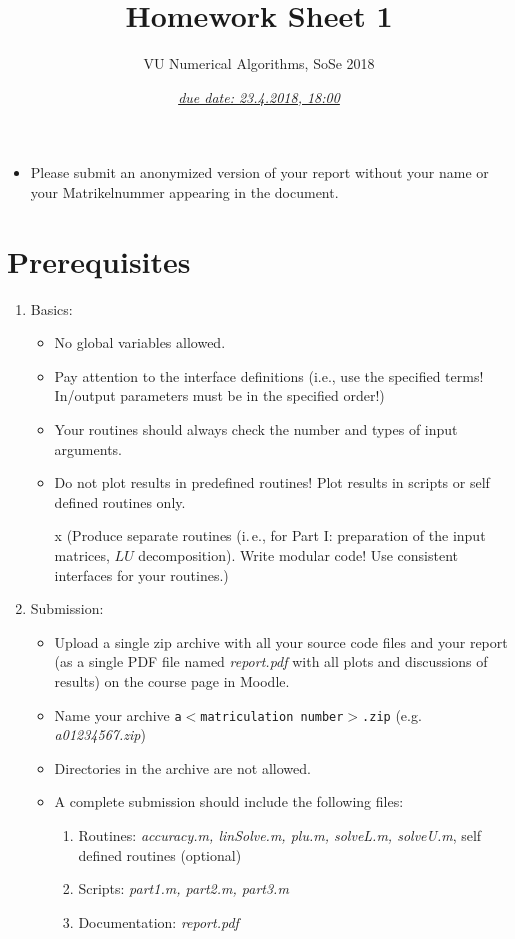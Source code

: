 \documentclass{scrartcl}
\title{Homework Sheet 1}
\subtitle{VU Numerical Algorithms, SoSe 2018}
\date{\underline{\emph{due date: 23.4.2018, 18:00}}}
\newenvironment{mymdframed}[1]{%
\mdfsetup{%
frametitle={\colorbox{white}{\,#1\,}},
frametitleaboveskip=-\ht\strutbox,
frametitlealignment=\raggedright
}%
\begin{mdframed}[style=exampledefault]
}{\end{mdframed}}
\begin{document}
\maketitle

            \begin{itemize}
                \item Please submit an anonymized version of your report without your name or your Matrikelnummer appearing in the document. 
            \end{itemize}

\section*{Prerequisites}
\begin{enumerate}
	\item Basics:
	\begin{itemize}
		\item No global variables allowed.
		
		\item Pay attention to the interface definitions (i.e., use the specified terms! In/output parameters must be in the specified order!)
		\item Your routines should always check the number and types of input arguments.
		\item Do not plot results in predefined routines! Plot results in scripts or self defined routines only.
		\item[x] (Produce separate routines (i.\,e., for Part I: preparation of the input matrices, $LU$ decomposition). Write modular code! Use consistent interfaces for your routines.)
	\end{itemize}
	\item Submission:	
	\begin{itemize}		
		\item  Upload a single zip archive with all your source code files and your report (as a single
			PDF file named \textit{report.pdf} with all plots and discussions of results) on the course page in Moodle.
		\item Name your archive \texttt{a$<$matriculation number$>$.zip} (e.g. \textit{a01234567.zip})
		\item Directories in the archive are not allowed.
		\item A complete submission should include the following files:
		\begin{enumerate}
		\item Routines: \textit{accuracy.m, linSolve.m, plu.m, solveL.m, solveU.m}, self defined routines (optional)
		\item Scripts: \textit{part1.m, part2.m, part3.m}
		\item Documentation: \textit{report.pdf}
		\end{enumerate}
		
		\end{itemize}
	\end{enumerate}
\end{document}
